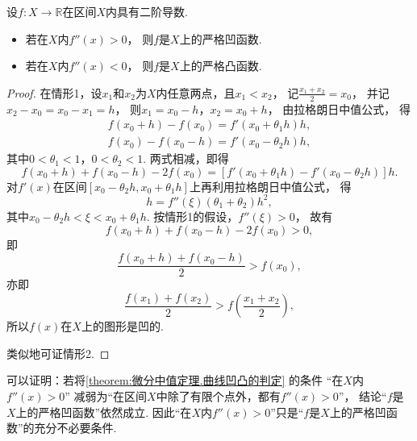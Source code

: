 \begin{theorem}[曲线凹凸的判定]\label{theorem:微分中值定理.曲线凹凸的判定}
设\(f\colon X\to\mathbb{R}\)在区间\(X\)内具有二阶导数.
\begin{itemize}
	\item 若在\(X\)内\(f''(x)>0\)，
	则\(f\)是\(X\)上的严格凹函数.
	\item 若在\(X\)内\(f''(x)<0\)，
	则\(f\)是\(X\)上的严格凸函数.
\end{itemize}
\begin{proof}
在情形1，设\(x_1\)和\(x_2\)为\(X\)内任意两点，且\(x_1 < x_2\)，
记\(\frac{x_1 + x_2}{2} = x_0\)，
并记\(x_2 - x_0 = x_0 - x_1 = h\)，
则\(x_1 = x_0 - h\)，\(x_2 = x_0 + h\)，
由拉格朗日中值公式，
得\begin{gather*}
	f(x_0 + h) - f(x_0) = f'(x_0 + \theta_1 h) h, \\
	f(x_0) - f(x_0 - h) = f'(x_0 - \theta_2 h) h,
\end{gather*}
其中\(0 < \theta_1 < 1\)，\(0 < \theta_2 < 1\).
两式相减，即得\begin{equation*}
	f(x_0 + h) + f(x_0 - h) - 2 f(x_0)
	= [ f'(x_0 + \theta_1 h) - f'(x_0 - \theta_2 h) ] h.
\end{equation*}
对\(f'(x)\)在区间\([x_0 - \theta_2 h,x_0 + \theta_1 h]\)上再利用拉格朗日中值公式，
得\begin{equation*}
	[ f'(x_0 + \theta_1 h) - f'(x_0 - \theta_2 h) ] h
	= f''(\xi) (\theta_1 + \theta_2) h^2,
\end{equation*}
其中\(x_0 - \theta_2 h < \xi < x_0 + \theta_1 h\).
按情形1的假设，\(f''(\xi) > 0\)，
故有\begin{equation*}
	f(x_0 + h) + f(x_0 - h) - 2 f(x_0) > 0,
\end{equation*}
即\begin{equation*}
	\frac{f(x_0 + h) + f(x_0 - h)}{2} > f(x_0),
\end{equation*}
亦即\begin{equation*}
	\frac{f(x_1) + f(x_2)}{2} > f\left(\frac{x_1 + x_2}{2}\right),
\end{equation*}
所以\(f(x)\)在\(X\)上的图形是凹的.

类似地可证情形2.
\end{proof}
\end{theorem}
\begin{remark}
可以证明：若将\cref{theorem:微分中值定理.曲线凹凸的判定} 的条件
“在\(X\)内\(f''(x)>0\)”
减弱为“在区间\(X\)中除了有限个点外，都有\(f''(x)>0\)”，
结论“\(f\)是\(X\)上的严格凹函数”依然成立.
因此“在\(X\)内\(f''(x)>0\)”只是“\(f\)是\(X\)上的严格凹函数”的充分不必要条件.
\end{remark}

